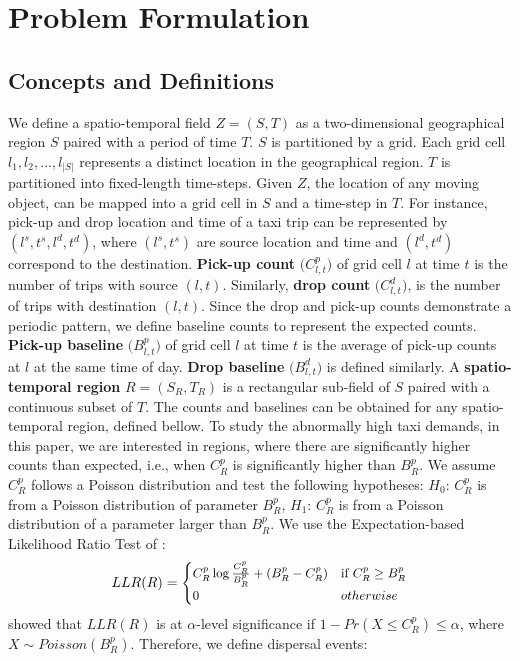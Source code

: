 \documentclass[letterpaper]{article} %
\begin{document}
\section{Problem Formulation}
\label{sec_formulation}
\subsection{Concepts and Definitions}
\label{sec_def}
We define a spatio-temporal field $Z=(S,T)$ as a two-dimensional geographical region $S$ paired with a period of time $T$. $S$ is partitioned by a grid. Each grid cell $l_1,l_2,...,l_{|S|}$ represents a distinct location in the geographical region. $T$ is partitioned into fixed-length time-steps. Given $Z$, the location of any moving object, can be mapped into a grid cell in $S$ and a time-step in $T$. For instance, pick-up and drop location and time of a taxi trip can be represented by $(l^s,t^s,l^d,t^d)$, where $(l^s,t^s)$ are source location and time and $(l^d,t^d)$ correspond to the destination. \textbf{Pick-up count} $\big(C^p_{l,t}\big)$ of grid cell $l$ at time $t$ is the number of trips with source $(l,t)$. Similarly, \textbf{drop count} $\big(C^d_{l,t}\big)$, is the number of trips with destination $(l,t)$. Since the drop and pick-up counts demonstrate a periodic pattern, we define baseline counts to represent the expected counts. \textbf{Pick-up baseline} $\big(B^p_{l,t}\big)$ of grid cell $l$ at time $t$ is the average of pick-up counts at $l$ at the same time of day. \textbf{Drop baseline} $\big(B^d_{l,t}\big)$ is defined similarly. A \textbf{spatio-temporal region} $R=(S_R,T_R)$ is a rectangular sub-field of $S$ paired with a continuous subset of $T$. The counts and baselines can be obtained for any spatio-temporal region, defined bellow. To study the abnormally high taxi demands, in this paper, we are interested in regions, where there are significantly higher counts than expected, i.e., when $C^p_R$ is significantly higher than $B^p_R$. We assume $C^p_R$ follows a Poisson distribution and test the following hypotheses: $H_0$: $C^p_R$ is from a Poisson distribution of parameter $B^p_R$, $H_1$: $C^p_R$ is from a Poisson distribution of a parameter larger than $B^p_R$. We use the Expectation-based Likelihood Ratio Test of \cite{neill2009expectation}:
\begin{equation}
\small
\label{ebp}
LLR(R) = \begin{cases}
C^p_R\log\frac{C^p_R}{B^p_R}+(B^p_R-C^p_R) & \text{if\ } C^p_R\geq B^p_R \\
0 & otherwise
\end{cases}
\end{equation}
\cite{zhou2016traffic} showed that $LLR(R)$ is at $\alpha$-level significance if $1-Pr(X\leq C^p_R)\leq \alpha$, where $X\sim Poisson(B^p_R)$. Therefore, we define dispersal events:
\end{document}
